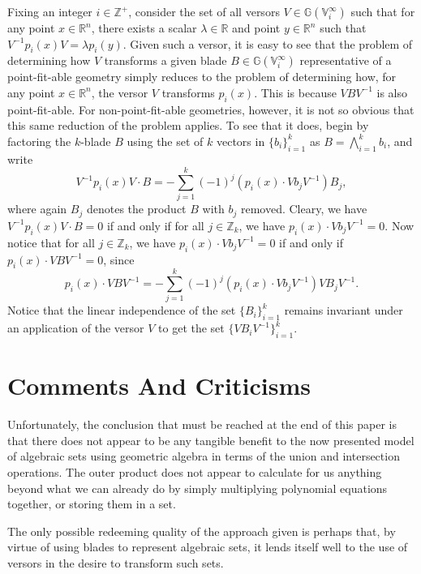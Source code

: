\documentclass{birkjour}
\theoremstyle{definition}
\theoremstyle{remark}
\numberwithin{equation}{section}
\newcommand{\G}{\mathbb{G}}
\newcommand{\V}{\mathbb{V}}
\newcommand{\R}{\mathbb{R}}
\newcommand{\Z}{\mathbb{Z}}
\begin{document}
Fixing an integer $i\in\Z^+$, consider the set of all versors
$V\in\G(\V_i^\infty)$ such that for any point $x\in\R^n$,
there exists a scalar $\lambda\in\R$ and point $y\in\R^n$ such that $V^{-1}p_i(x)V=\lambda p_i(y)$.
Given such a versor, it is easy to see that the
problem of determining how $V$
transforms a given blade $B\in\G(\V_i^\infty)$ representative
of a point-fit-able geometry simply reduces
to the problem of determining how, for any point $x\in\R^n$,
the versor $V$ transforms $p_i(x)$.  This is because $VBV^{-1}$
is also point-fit-able.  For non-point-fit-able
geometries, however, it is not so obvious that this
same reduction of the problem applies.
To see that it does, begin by
factoring the $k$-blade $B$ using the set of $k$ vectors in $\{b_i\}_{i=1}^k$
as $B=\bigwedge_{i=1}^k b_i$, and write
\begin{equation}
V^{-1}p_i(x)V\cdot B=-\sum_{j=1}^k(-1)^j(p_i(x)\cdot Vb_jV^{-1})B_j,
\end{equation}
where again $B_j$ denotes the product $B$ with $b_j$ removed.
Cleary, we have $V^{-1}p_i(x)V\cdot B=0$ if and only if for all $j\in\Z_k$,
we have $p_i(x)\cdot Vb_jV^{-1}=0$.  Now notice that for all $j\in\Z_k$,
we have $p_i(x)\cdot Vb_jV^{-1}=0$ if and only if $p_i(x)\cdot VBV^{-1}=0$,
since
\begin{equation}
p_i(x)\cdot VBV^{-1} = -\sum_{j=1}^k(-1)^j(p_i(x)\cdot Vb_jV^{-1})VB_jV^{-1}.
\end{equation}
Notice that the linear independence of the set $\{B_i\}_{i=1}^k$ remains invariant
under an application of the versor $V$ to get the set $\{VB_iV^{-1}\}_{i=1}^k$.



\section{Comments And Criticisms}

Unfortunately, the conclusion that must be reached at the end of this paper is
that there does not appear to be any tangible benefit to the now
presented model of algebraic sets using geometric algebra in terms
of the union and intersection operations.  The outer product does not
appear to calculate for us anything beyond what we can already
do by simply multiplying polynomial equations together, or storing
them in a set.

The only possible redeeming quality of the approach given is perhaps
that, by virtue of using blades to represent algebraic sets, it lends
itself well to the use of versors in the desire to transform such sets.
\end{document}
